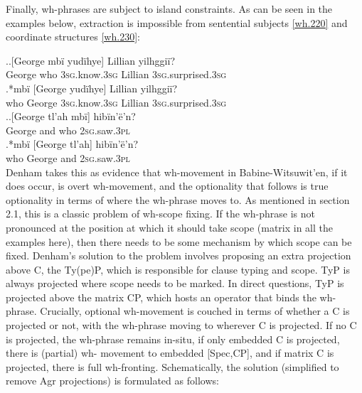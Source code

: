 \documentclass[11pt]{article}
\begin{document}
Finally, wh-phrases are subject to island constraints. As can be seen in the examples below, extraction is impossible from sentential subjects \ref{wh.220} and coordinate structures \ref{wh.230}:

\ex.\label{wh.220}\ag.{}[George mb\"i yud\"ihye] Lillian yilhggi\"i?\\
   George who \textsc{3sg}.know.\textsc{3sg} Lillian \textsc{3sg}.surprised.\textsc{3sg}\\
   \bg.*mb\"i [George yud\"ihye] Lillian yilhggi\"i?\\
   who George \textsc{3sg}.know.\textsc{3sg} Lillian \textsc{3sg}.surprised.\textsc{3sg}\\

\ex.\label{wh.230}\ag.{}[George tl'ah mb\"i] hib\"in'\"e'n?\\
   George and who \textsc{2sg}.saw.\textsc{3pl}\\
   \bg.*mb\"i [George tl'ah] hib\"in'\"e'n?\\
   who George and \textsc{2sg}.saw.\textsc{3pl}\\

Denham takes this as evidence that wh-movement in Babine-Witsuwit'en, if it does occur, is overt wh-movement, and the optionality that follows is true optionality in terms of where the wh-phrase moves to. As mentioned in section 2.1, this is a classic problem of wh-scope fixing. If the wh-phrase is not pronounced at the position at which it should take scope (matrix in all the examples here), then there needs to be some mechanism by which scope can be fixed. Denham's solution to the problem involves proposing an extra projection above C, the Ty(pe)P, which is responsible for clause typing and scope. TyP is always projected where scope needs to be marked. In direct questions, TyP is projected above the matrix CP, which hosts an operator that binds the wh-phrase. Crucially, optional wh-movement is couched in terms of whether a C is projected or not, with the wh-phrase moving to wherever C is projected. If no C is projected, the wh-phrase remains in-situ, if only embedded C is projected, there is (partial) wh- movement to embedded [Spec,CP], and if matrix C is projected, there is full wh-fronting. Schematically, the solution (simplified to remove Agr projections) is formulated as follows:
\end{document}
